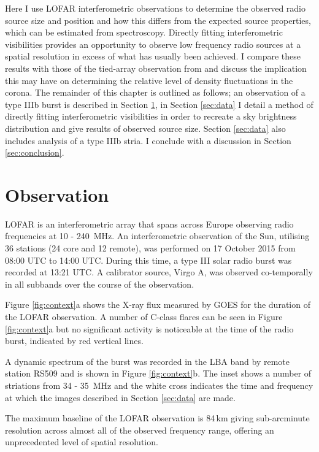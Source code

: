 Here I use LOFAR interferometric observations to determine the observed radio source size and position and how this differs from the expected source properties, which can be estimated from spectroscopy. %
Directly fitting interferometric visibilities provides an opportunity to observe low frequency radio sources at a spatial resolution in excess of what has usually been achieved. I compare these results with those of the tied-array observation from \cite{Kontar2017} and discuss the implication this may have on determining the relative level of density fluctuations in the corona. 
The remainder of this chapter is outlined as follows; an observation of a type IIIb burst is described in Section \ref{sec:obs}, in Section \ref{sec:data} I detail a method of directly fitting interferometric visibilities in order to recreate a sky brightness distribution and give results of observed source size. Section \ref{sec:data} also includes analysis of a type IIIb stria. I conclude with a discussion in Section \ref{sec:conclusion}.

\section{Observation} \label{sec:obs}
LOFAR is an interferometric array that spans across Europe observing radio frequencies at 10 - 240~MHz. 
An interferometric observation of the Sun, utilising 36 stations (24 core and 12 remote), was performed on 17 October 2015 from 08:00 UTC to 14:00 UTC. During this time, a type III solar radio burst was recorded  at 13:21 UTC. A calibrator source, Virgo A, was observed co-temporally in all subbands over the course of the observation.

Figure \ref{fig:context}a shows the X-ray flux measured by GOES for the duration of the LOFAR observation. A number of C-class flares can be seen in Figure \ref{fig:context}a but no significant activity is noticeable at the time of the radio burst, indicated by red vertical lines.

A dynamic spectrum of the burst was recorded in the LBA band by remote station RS509 and is shown in Figure \ref{fig:context}b. The inset shows a number of striations from 34 - 35~MHz and the white cross indicates the time and frequency at which the images described in Section \ref{sec:data} are made.

The maximum baseline of the LOFAR observation is 84\,km giving sub-arcminute resolution across almost all of the observed frequency range, offering an unprecedented level of spatial resolution.

